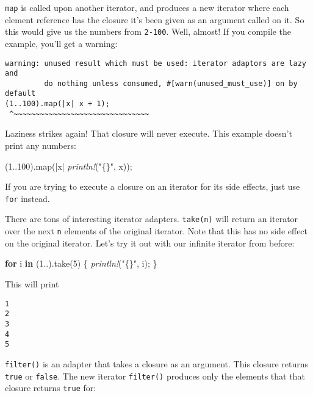 \documentclass[a4paper,]{book}
\newenvironment{Shaded}{\begin{snugshade}}{\end{snugshade}}
\newcommand{\KeywordTok}[1]{\textcolor[rgb]{0.13,0.29,0.53}{\textbf{{#1}}}}
\newcommand{\DecValTok}[1]{\textcolor[rgb]{0.00,0.00,0.81}{{#1}}}
\newcommand{\StringTok}[1]{\textcolor[rgb]{0.31,0.60,0.02}{{#1}}}
\newcommand{\PreprocessorTok}[1]{\textcolor[rgb]{0.56,0.35,0.01}{\textit{{#1}}}}
\newcommand{\NormalTok}[1]{{#1}}
\begin{document}
\texttt{map} is called upon another iterator, and produces a new
iterator where each element reference has the closure it's been given as
an argument called on it. So this would give us the numbers from
\texttt{2-100}. Well, almost! If you compile the example, you'll get a
warning:

\begin{verbatim}
warning: unused result which must be used: iterator adaptors are lazy and
         do nothing unless consumed, #[warn(unused_must_use)] on by default
(1..100).map(|x| x + 1);
 ^~~~~~~~~~~~~~~~~~~~~~~~~~~~~~~~
\end{verbatim}

Laziness strikes again! That closure will never execute. This example
doesn't print any numbers:

\begin{Shaded}
\begin{Highlighting}[]
\NormalTok{(}\DecValTok{1.}\NormalTok{.}\DecValTok{100}\NormalTok{).map(|x| }\PreprocessorTok{println!}\NormalTok{(}\StringTok{"\{\}"}\NormalTok{, x));}
\end{Highlighting}
\end{Shaded}

If you are trying to execute a closure on an iterator for its side
effects, just use \texttt{for} instead.

There are tons of interesting iterator adapters. \texttt{take(n)} will
return an iterator over the next \texttt{n} elements of the original
iterator. Note that this has no side effect on the original iterator.
Let's try it out with our infinite iterator from before:

\begin{Shaded}
\begin{Highlighting}[]
\KeywordTok{for} \NormalTok{i }\KeywordTok{in} \NormalTok{(}\DecValTok{1.}\NormalTok{.).take(}\DecValTok{5}\NormalTok{) \{}
    \PreprocessorTok{println!}\NormalTok{(}\StringTok{"\{\}"}\NormalTok{, i);}
\NormalTok{\}}
\end{Highlighting}
\end{Shaded}

This will print

\begin{verbatim}
1
2
3
4
5
\end{verbatim}

\texttt{filter()} is an adapter that takes a closure as an argument.
This closure returns \texttt{true} or \texttt{false}. The new iterator
\texttt{filter()} produces only the elements that that closure returns
\texttt{true} for:
\end{document}
